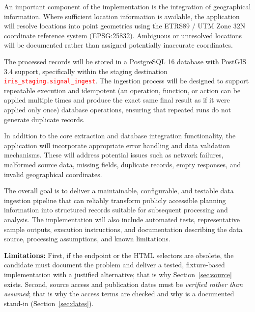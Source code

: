 \documentclass[11pt,a4paper]{article}
\newcommand{\code}[1]{{\small\codeurl{#1}}}
\begin{document}
An important component of the implementation is the integration of geographical information. Where sufficient location information is available, the application will resolve locations into point geometries using the ETRS89 / UTM Zone 32N coordinate reference system (EPSG:25832). Ambiguous or unresolved locations will be documented rather than assigned potentially inaccurate coordinates.

The processed records will be stored in a PostgreSQL 16 database with PostGIS 3.4 support, specifically within the staging destination \texttt{\textcolor{red}{iris\_staging.signal\_ingest}}. The ingestion process will be designed to support repeatable execution and idempotent (an operation, function, or action can be applied multiple times and produce the exact same final result as if it were applied only once) database operations, ensuring that repeated runs do not generate duplicate records.

In addition to the core extraction and database integration functionality, the application will incorporate appropriate error handling and data validation mechanisms. These will address potential issues such as network failures, malformed source data, missing fields, duplicate records, empty responses, and invalid geographical coordinates.

The overall goal is to deliver a maintainable, configurable, and testable data ingestion pipeline that can reliably transform publicly accessible planning information into structured records suitable for subsequent processing and analysis. The implementation will also include automated tests, representative sample outputs, execution instructions, and documentation describing the data source, processing assumptions, and known limitations.

\noindent
\textbf{Limitations:} 
First, if the endpoint or the HTML selectors are obsolete, the
candidate must document the problem and deliver a tested, fixture-based implementation with a justified alternative; that is
why Section~\ref{sec:source} exists. Second, source access and publication dates must be \emph{verified rather than
assumed}; that is why the access terms are checked and why \textcolor{red}{\code{published_at}} is a documented stand-in
(Section~\ref{sec:dates}).
\end{document}
